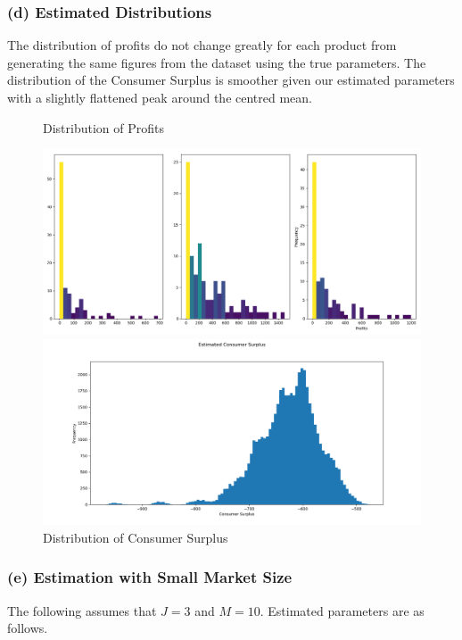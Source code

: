 \documentclass{article}
\begin{document}
\subsubsection{(d) Estimated Distributions}

The distribution of profits do not change greatly for each product from generating the same figures from the dataset using the true parameters. The distribution of the Consumer Surplus is smoother given our estimated parameters with a slightly flattened peak around the centred mean.

\begin{figure}[h]
  \caption{Distribution of Profits}
  \centering
    \includegraphics[width=1.0\textwidth]{fig_hist_profits3_e}
  \caption{Distribution of Consumer Surplus}
  \centering
    \includegraphics[width=1.0\textwidth]{fig_hist_consumersurplus3_e}
\end{figure}
\FloatBarrier

\subsubsection{(e) Estimation with Small Market Size}

The following assumes that $J=3$ and $M=10$. Estimated parameters are as follows.
\end{document}
